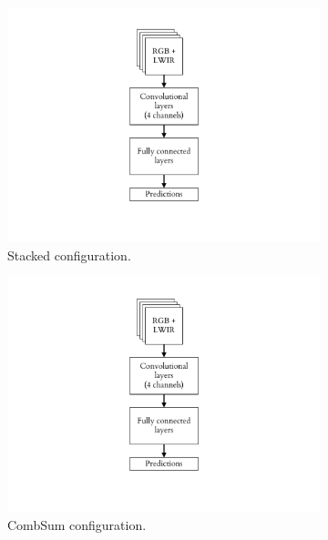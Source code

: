\documentclass{l4proj}
\begin{document}
\begin{figure}[ht]
  \centering
  \begin{subfigure}[h!]{0.3\textwidth}
    \includegraphics[width=\textwidth, page={1}, trim={6.5cm 2.2cm 6.5cm 1.5cm}, clip]{images/models/archs}
    \caption{Stacked configuration.}
    \label{fig:arch_stacked}
  \end{subfigure}
  \begin{subfigure}[h!]{0.3\textwidth}
    \includegraphics[width=\textwidth, page={2}, trim={6.5cm 2.2cm 6.5cm 1.5cm}, clip]{images/models/archs}
    \caption{CombSum configuration.}
    \label{fig:arch_combsum}
  \end{subfigure}
  \begin{subfigure}[h!]{0.3\textwidth}

\end{subfigure}
\end{figure}
\end{document}
